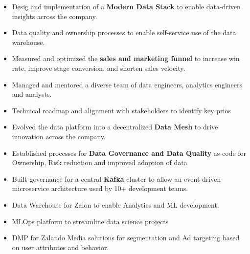 \documentclass[10pt,a4paper,ragged2e,withhyper]{altacv}
\begin{document}
\begin{paracol}{2}


\begin{itemize}
  \item Desig and implementation of a \textbf{Modern Data Stack} to enable data-driven insights across the company.
  \item Data quality and ownership processes to enable self-service use of the data warehouse.
  \item Measured and optimized the \textbf{sales and marketing funnel} to increase win rate, improve stage conversion, and shorten sales velocity.
\end{itemize}

\divider

\begin{itemize}
  \item Managed and mentored a diverse team of data engineers, analytics engineers and analysts.
  \item Technical roadmap and alignment with stakeholders to identify key prios
  \item Evolved the data platform into a decentralized \textbf{Data Mesh} to drive innovation across the company.
  \item Established processes for \textbf{Data Governance and Data Quality} as-code for Ownership, Risk reduction and improved adoption of data
  \item Built governance for a central \textbf{Kafka} cluster to allow an event driven microservice architecture used by 10+ development teams.
\end{itemize}

\divider

\begin{itemize}
  \item Data Warehouse for Zalon to enable Analytics and ML development. 
  \item MLOps platform to streamline data science projects 
  \item DMP for Zalando Media solutions for segmentation and Ad targeting based on user attributes and behavior.
\end{itemize}



\end{paracol}
\end{document}
